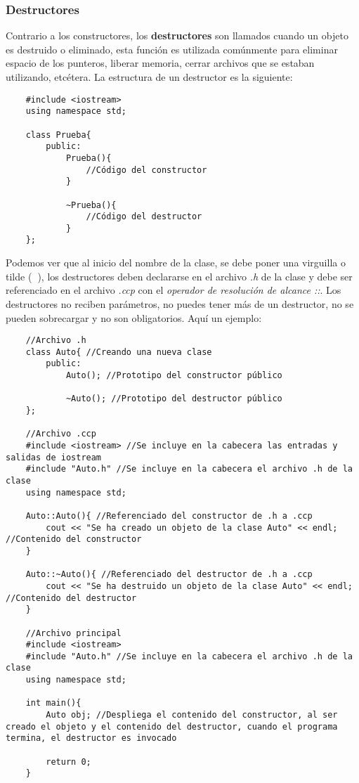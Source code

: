 \subsubsection{Destructores}
Contrario a los constructores, los \textbf{destructores} son llamados cuando un objeto es destruido o eliminado, esta función es utilizada comúnmente para eliminar espacio de los punteros, liberar memoria, cerrar archivos que se estaban utilizando, etcétera. La estructura de un destructor es la siguiente:
\begin{lstlisting}
    #include <iostream>
    using namespace std;

    class Prueba{
        public:
            Prueba(){
                //Código del constructor
            }
            
            ~Prueba(){
                //Código del destructor
            }
    };
\end{lstlisting}
Podemos ver que al inicio del nombre de la clase, se debe poner una virguilla o tilde (\textbf{~}), los destructores deben declararse en el archivo \textit{.h} de la clase y debe ser referenciado en el archivo \textit{.ccp} con el \textit{operador de resolución de alcance ::}. Los destructores no reciben parámetros, no puedes tener más de un destructor, no se pueden sobrecargar y no son obligatorios. Aquí un ejemplo:
\begin{lstlisting}
    //Archivo .h
    class Auto{ //Creando una nueva clase
        public:
            Auto(); //Prototipo del constructor público
            
            ~Auto(); //Prototipo del destructor público
    };
    
    //Archivo .ccp
    #include <iostream> //Se incluye en la cabecera las entradas y salidas de iostream
    #include "Auto.h" //Se incluye en la cabecera el archivo .h de la clase
    using namespace std;
    
    Auto::Auto(){ //Referenciado del constructor de .h a .ccp
        cout << "Se ha creado un objeto de la clase Auto" << endl; //Contenido del constructor
    }
    
    Auto::~Auto(){ //Referenciado del destructor de .h a .ccp
        cout << "Se ha destruido un objeto de la clase Auto" << endl; //Contenido del destructor
    }
    
    //Archivo principal
    #include <iostream>
    #include "Auto.h" //Se incluye en la cabecera el archivo .h de la clase
    using namespace std;
    
    int main(){
        Auto obj; //Despliega el contenido del constructor, al ser creado el objeto y el contenido del destructor, cuando el programa termina, el destructor es invocado
        
        return 0;
    }
\end{lstlisting}



